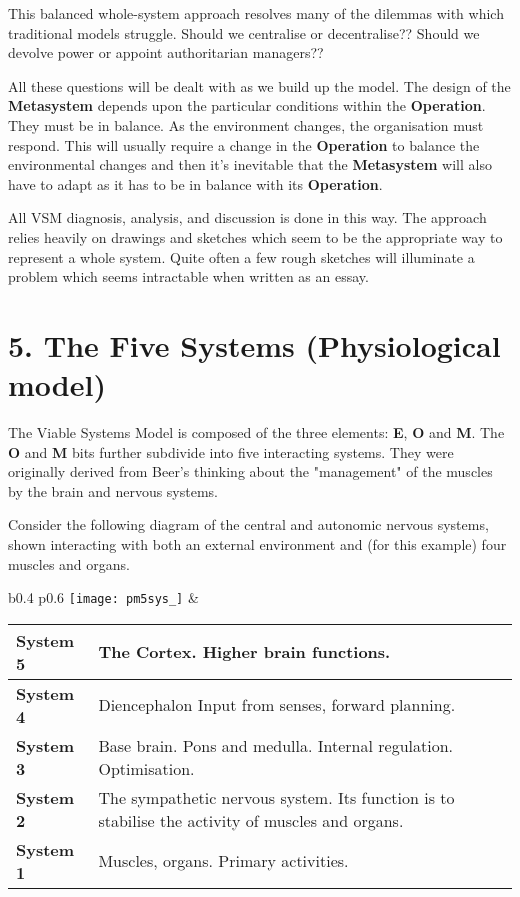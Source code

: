 This balanced whole-system approach resolves many of the dilemmas with which traditional models struggle. Should we centralise or decentralise?? Should we devolve power or appoint authoritarian managers??

All these questions will be dealt with as we build up the model. The design of the \textcolor{M}{\textbf{Metasystem}} depends upon the particular conditions within the \textcolor{O}{\textbf{Operation}}. They must be in balance. As the environment changes, the organisation must respond. This will usually require a change in the \textcolor{O}{\textbf{Operation}} to balance the environmental changes and then it's inevitable that the \textcolor{M}{\textbf{Metasystem}} will also have to adapt as it has to be in balance with its \textcolor{O}{\textbf{Operation}}.

All VSM diagnosis, analysis, and discussion is done in this way. The approach relies heavily on drawings and sketches which seem to be the appropriate way to represent a whole system. Quite often a few rough sketches will illuminate a problem which seems intractable when written as an essay.

\section*{5. The Five Systems (Physiological model)}
The Viable Systems Model is composed of the three elements: \textcolor{E}{\textbf{E}}, \textcolor{O}{\textbf{O}} and \textcolor{M}{\textbf{M}}. The \textcolor{O}{\textbf{O}} and \textcolor{M}{\textbf{M}} bits further subdivide into five interacting systems. They were originally derived from Beer's thinking about the "management" of the muscles by the brain and nervous systems.

Consider the following diagram of the central and autonomic nervous systems, shown interacting with both an external environment and (for this example) four muscles and organs.

\begin{tabular}{ b{} p{}}
	\texttt{[image: pm5sys\_]}
    &
    \begin{tabular}{ | m{} | p{} | }
        \hline
        \textbf{System 5} & The Cortex. Higher brain functions. \\
        \hline
        \textbf{System 4} & Diencephalon Input from senses, forward planning. \\
        \hline
        \textbf{System 3} & Base brain. Pons and medulla. Internal regulation. \mbox{Optimisation}. \\
        \hline
        \textbf{System 2} & The sympathetic nervous system. Its function is to \mbox{stabilise} the activity of muscles and organs. \\
        \hline
        \textbf{System 1} & Muscles, organs. Primary activities. \\
        \hline
    \end{tabular}

\end{tabular}
%

